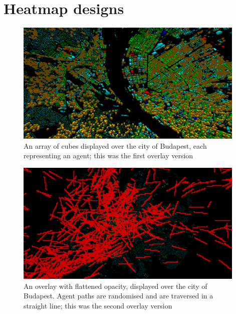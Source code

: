\appendix
\setcounter{chapter}{\appendixnumber}

\chapter{Heatmap designs}

\begin{figure}[!h]
    \centering
    \includegraphics[width=110mm, keepaspectratio]{images/overlay_v1.png}
    \caption{An array of cubes displayed over the city of Budapest, each representing an agent; this was the first overlay version\ \label{overlay_v1}}
\end{figure}
\begin{figure}[!h]
    \centering
    \includegraphics[width=110mm, keepaspectratio]{images/overlay_v2.png}
    \caption{An overlay with flattened opacity, displayed over the city of Budapest. Agent paths are randomised and are traversed in a straight line; this was the second overlay version\ \label{overlay_v2}}
\end{figure}

